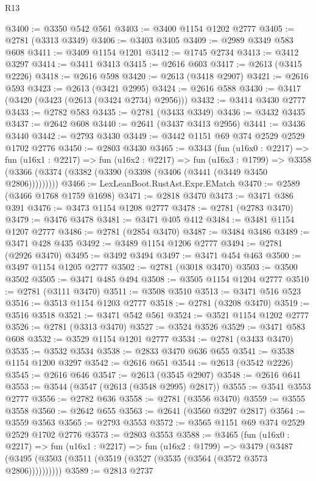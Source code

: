\begin{lexlean}{R13}
\begin{coremodule}
@3400 := @3350 @542 @561
@3403 := @3400 @1154 @1202 @2777
@3405 := @2781 (@3313 @3349)
@3406 := @3403 @3405
@3409 := @2989 @3349 @583 @608
@3411 := @3409 @1154 @1201
@3412 := @1745 @2734
@3413 := @3412 @3297
@3414 := @3411 @3413
@3415 := @2616 @603
@3417 := @2613 (@3415 @2226)
@3418 := @2616 @598
@3420 := @2613 (@3418 @2907)
@3421 := @2616 @593
@3423 := @2613 (@3421 @2995)
@3424 := @2616 @588
@3430 := @3417 (@3420 (@3423 (@2613 (@3424 @2734) @2956)))
@3432 := @3414 @3430 @2777
@3433 := @2782 @583
@3435 := @2781 (@3433 @3349)
@3436 := @3432 @3435
@3437 := @2642 @608
@3440 := @2641 (@3437 @3413 @2956)
@3441 := @3436 @3440
@3442 := @2793 @3430
@3449 := @3442 @1151 @69 @374 @2529 @2529 @1702 @2776
@3450 := @2803 @3430
@3465 := @3343
    (fun (u16x0 : @2217) =>
    fun (u16x1 : @2217) =>
    fun (u16x2 : @2217) =>
    fun (u16x3 : @1799) =>
    @3358 (@3366 (@3374 (@3382 (@3390 (@3398 (@3406 (@3441 (@3449 @3450 @2806)))))))))
@3466 := LexLeanBoot.RustAst.Expr.EMatch
@3470 := @2589 (@3466 @1768 @1759 @1698)
@3471 := @2818 @3470
@3473 := @3471 @386 @391
@3476 := @3473 @1154 @1208 @2777
@3478 := @2781 (@2783 @3470)
@3479 := @3476 @3478
@3481 := @3471 @405 @412
@3484 := @3481 @1154 @1207 @2777
@3486 := @2781 (@2854 @3470)
@3487 := @3484 @3486
@3489 := @3471 @428 @435
@3492 := @3489 @1154 @1206 @2777
@3494 := @2781 (@2926 @3470)
@3495 := @3492 @3494
@3497 := @3471 @454 @463
@3500 := @3497 @1154 @1205 @2777
@3502 := @2781 (@3018 @3470)
@3503 := @3500 @3502
@3505 := @3471 @485 @494
@3508 := @3505 @1154 @1204 @2777
@3510 := @2781 (@3111 @3470)
@3511 := @3508 @3510
@3513 := @3471 @516 @523
@3516 := @3513 @1154 @1203 @2777
@3518 := @2781 (@3208 @3470)
@3519 := @3516 @3518
@3521 := @3471 @542 @561
@3524 := @3521 @1154 @1202 @2777
@3526 := @2781 (@3313 @3470)
@3527 := @3524 @3526
@3529 := @3471 @583 @608
@3532 := @3529 @1154 @1201 @2777
@3534 := @2781 (@3433 @3470)
@3535 := @3532 @3534
@3538 := @2833 @3470 @636 @655
@3541 := @3538 @1154 @1200 @3297
@3542 := @2616 @651
@3544 := @2613 (@3542 @2226)
@3545 := @2616 @646
@3547 := @2613 (@3545 @2907)
@3548 := @2616 @641
@3553 := @3544 (@3547 (@2613 (@3548 @2995) @2817))
@3555 := @3541 @3553 @2777
@3556 := @2782 @636
@3558 := @2781 (@3556 @3470)
@3559 := @3555 @3558
@3560 := @2642 @655
@3563 := @2641 (@3560 @3297 @2817)
@3564 := @3559 @3563
@3565 := @2793 @3553
@3572 := @3565 @1151 @69 @374 @2529 @2529 @1702 @2776
@3573 := @2803 @3553
@3588 := @3465
    (fun (u16x0 : @2217) =>
    fun (u16x1 : @2217) =>
    fun (u16x2 : @1799) =>
    @3479 (@3487 (@3495 (@3503 (@3511 (@3519 (@3527 (@3535 (@3564 (@3572 @3573 @2806))))))))))
@3589 := @2813 @2737

\end{coremodule}
\end{lexlean}
